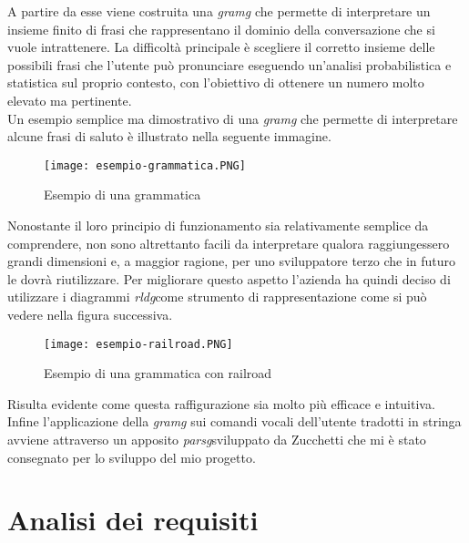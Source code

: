 A partire da esse viene costruita una \emph{\gls{gramg}} che permette di interpretare un insieme finito di frasi che rappresentano il dominio della conversazione che si vuole intrattenere. La difficoltà principale è scegliere il corretto insieme delle possibili frasi che l'utente può pronunciare eseguendo un'analisi probabilistica e statistica sul proprio contesto, con l'obiettivo di ottenere un numero molto elevato ma pertinente.\\
Un esempio semplice ma dimostrativo di una \emph{\gls{gramg}} che permette di interpretare alcune frasi di saluto è illustrato nella seguente immagine.

\begin{figure}[htbp]
	\begin{center}
		\texttt{[image: esempio-grammatica.PNG]}
		\caption{Esempio di una grammatica}
	\end{center}
\end{figure}

\vspace{2cm}

Nonostante il loro principio di funzionamento sia relativamente semplice da comprendere, non sono altrettanto facili da interpretare qualora raggiungessero grandi dimensioni e, a maggior ragione, per uno sviluppatore terzo che in futuro le dovrà riutilizzare. Per migliorare questo aspetto l'azienda ha quindi deciso di utilizzare i diagrammi \emph{\gls{rldg}}\glsfirstoccur come strumento di rappresentazione come si può vedere nella figura successiva.

\begin{figure}[htbp]
	\begin{center}
		\texttt{[image: esempio-railroad.PNG]}
		\caption{Esempio di una grammatica con railroad}
	\end{center}
\end{figure}

Risulta evidente come questa raffigurazione sia molto più efficace e intuitiva. \\
Infine l'applicazione della \emph{\gls{gramg}} sui comandi vocali dell'utente tradotti in stringa avviene attraverso un apposito \emph{\gls{parsg}}\glsfirstoccur sviluppato da Zucchetti che mi è stato consegnato per lo sviluppo del mio progetto.
\section{Analisi dei requisiti}
